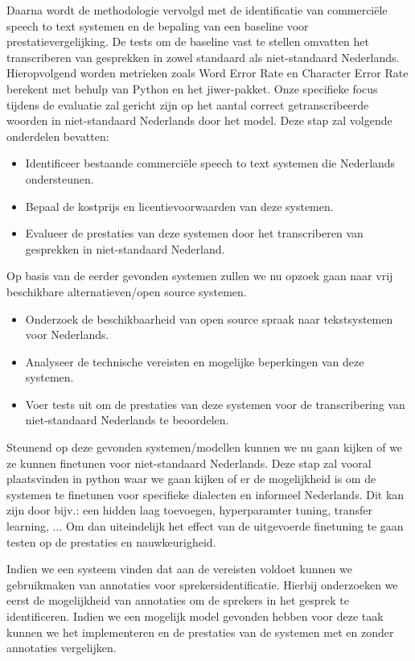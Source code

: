 \par Daarna wordt de methodologie vervolgd met de identificatie van commerciële speech to text systemen en de bepaling van een baseline voor prestatievergelijking. De tests om de baseline vast te stellen omvatten het transcriberen van gesprekken in zowel standaard als niet-standaard Nederlands. Hieropvolgend worden metrieken zoals Word Error Rate en Character Error Rate berekent met behulp van Python en het jiwer-pakket. Onze specifieke focus tijdens de evaluatie zal gericht zijn op het aantal correct getranscribeerde woorden in niet-standaard Nederlands door het model.
Deze stap zal volgende onderdelen bevatten:
\begin{itemize}
    \item Identificeer bestaande commerciële speech to text systemen die Nederlands ondersteunen.
    \item Bepaal de kostprijs en licentievoorwaarden van deze systemen.
    \item Evalueer de prestaties van deze systemen door het transcriberen van gesprekken in niet-standaard Nederland.
\end{itemize}   
\par Op basis van de eerder gevonden systemen zullen we nu opzoek gaan naar vrij beschikbare alternatieven/open source systemen.
\begin{itemize}
    \item Onderzoek de beschikbaarheid van open source spraak naar tekstsystemen voor Nederlands.
    \item Analyseer de technische vereisten en mogelijke beperkingen van deze systemen.
    \item Voer tests uit om de prestaties van deze systemen voor de transcribering van niet-standaard Nederlands te beoordelen.
\end{itemize}
\par Steunend op deze gevonden systemen/modellen kunnen we nu gaan kijken of we ze kunnen finetunen voor niet-standaard Nederlands. Deze stap zal vooral plaatsvinden in python waar we gaan kijken of er de mogelijkheid is om de systemen te finetunen voor specifieke dialecten en informeel Nederlands. Dit kan zijn door bijv.: een hidden laag toevoegen, hyperparamter tuning, transfer learning, ... Om dan uiteindelijk het effect van de uitgevoerde finetuning te gaan testen op de prestaties en nauwkeurigheid.

\par Indien we een systeem vinden dat aan de vereisten voldoet kunnen we gebruikmaken van annotaties voor sprekersidentificatie. Hierbij onderzoeken we eerst de mogelijkheid van annotaties om de sprekers in het gesprek te identificeren. Indien we een mogelijk model gevonden hebben voor deze taak kunnen we het implementeren en de prestaties van de systemen met en zonder annotaties vergelijken.

